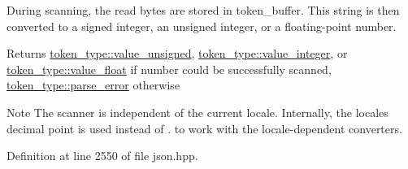 During scanning, the read bytes are stored in token\+\_\+buffer. This string is then converted to a signed integer, an unsigned integer, or a floating-\/point number.

\begin{DoxyReturn}{Returns}
\hyperlink{classnlohmann_1_1detail_1_1lexer_a3f313cdbe187cababfc5e06f0b69b098aaf1f040fcd2f674d2e5893d7a731078f}{token\+\_\+type\+::value\+\_\+unsigned}, \hyperlink{classnlohmann_1_1detail_1_1lexer_a3f313cdbe187cababfc5e06f0b69b098a5064b6655d88a50ae16665cf7751c0ee}{token\+\_\+type\+::value\+\_\+integer}, or \hyperlink{classnlohmann_1_1detail_1_1lexer_a3f313cdbe187cababfc5e06f0b69b098a0d2671a6f81efb91e77f6ac3bdb11443}{token\+\_\+type\+::value\+\_\+float} if number could be successfully scanned, \hyperlink{classnlohmann_1_1detail_1_1lexer_a3f313cdbe187cababfc5e06f0b69b098a456e19aeafa334241c7ff3f589547f9d}{token\+\_\+type\+::parse\+\_\+error} otherwise
\end{DoxyReturn}
\begin{DoxyNote}{Note}
The scanner is independent of the current locale. Internally, the locale\textquotesingle{}s decimal point is used instead of {\ttfamily .} to work with the locale-\/dependent converters. 
\end{DoxyNote}


Definition at line 2550 of file json.\+hpp.


